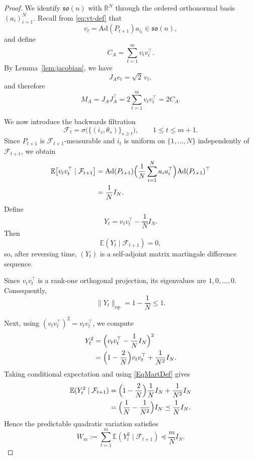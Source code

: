 \documentclass[11pt, reqno]{amsart}
\numberwithin{equation}{section}
\theoremstyle{remark}
\newcommand{\R}{\mathbb{R}}
\newcommand{\E}{\mathbb{E}}
\newcommand{\1}{\mathbf{1}}
\newcommand{\so}{\mathfrak{so}}
\newcommand{\op}{\mathrm{op}}
\newcommand{\Ad}{\mathrm{Ad}}
\begin{document}
\begin{proof}
We identify $\so(n)$ with $\R^N$ through the ordered orthonormal basis
$(a_i)_{i=1}^N$. Recall from \eqref{eq:vt-def} that
\[
v_t=\Ad(P_{t+1})a_{i_t}\in \so(n),
\]
and define
\begin{equation}
\label{eq:C-def-explicit}
C_A=\sum_{t=1}^m v_tv_t^\top.
\end{equation}
By Lemma~\ref{lem:jacobian}, we have
\[
J_A e_t=\sqrt{2}\,v_t,
\]
and therefore
\begin{equation}
\label{eq:M-from-C-explicit}
M_A=J_AJ_A^\top=2\sum_{t=1}^m v_tv_t^\top=2C_A.
\end{equation}

We now introduce the backwards filtration
\[
\mathcal F_t=\sigma\bigl(\{(i_s,\theta_s)\}_{s\ge t}\bigr),
\qquad 1\le t\le m+1.
\]
Since $P_{t+1}$ is $\mathcal F_{t+1}$-measurable and $i_t$ is uniform on
$\{1,\dots,N\}$ independently of $\mathcal F_{t+1}$, we obtain
\begin{align}
\E\bigl[v_tv_t^\top\mid \mathcal F_{t+1}\bigr]
&=
\Ad(P_{t+1})
\Bigl(
\frac1N\sum_{i=1}^N a_ia_i^\top
\Bigr)
\Ad(P_{t+1})^\top \notag\\
&=
\frac1N I_N.
\label{EqMartDef}
\end{align}
Define
\begin{equation}
\label{eq:Yt-def-explicit}
Y_t=v_tv_t^\top-\frac1N I_N.
\end{equation}
Then
\[
\E(Y_t\mid \mathcal F_{t+1})=0,
\]
so, after reversing time, $(Y_t)$ is a self-adjoint matrix martingale
difference sequence.

Since $v_tv_t^\top$ is a rank-one orthogonal projection, its eigenvalues are
$1,0,\dots,0$. 
Consequently,
\begin{equation}
\label{eq:Yt-norm-explicit}
\|Y_t\|_{\op}=1-\frac1N\le 1.
\end{equation}

Next, using $(v_tv_t^\top)^2=v_tv_t^\top$, we compute
\begin{align*}
Y_t^2
&=
\Bigl(v_tv_t^\top-\frac1N I_N\Bigr)^2 \\
&=
\Bigl(1-\frac2N\Bigr)v_tv_t^\top+\frac1{N^2}I_N.
\end{align*}
Taking conditional expectation and using
\eqref{EqMartDef} gives
\begin{align}
\E(Y_t^2\mid \mathcal F_{t+1})
&=
\Bigl(1-\frac2N\Bigr)\frac1N I_N+\frac1{N^2}I_N \notag\\
&=
\Bigl(\frac1N-\frac1{N^2}\Bigr)I_N
\preceq
\frac1N I_N.
\label{eq:Yt-var-explicit}
\end{align}
Hence the predictable quadratic variation satisfies
\begin{equation}
\label{eq:Wm-explicit}
W_m:=\sum_{t=1}^m \E(Y_t^2\mid \mathcal F_{t+1})
\preceq \frac{m}{N}I_N.
\end{equation}


\end{proof}
\end{document}
